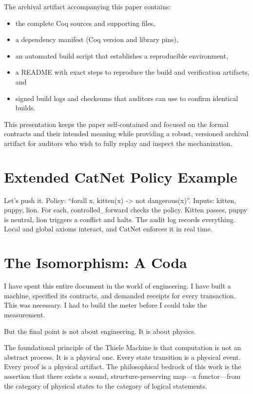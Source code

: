 \documentclass[11pt]{article}
\begin{document}
The archival artifact accompanying this paper contains:
\begin{itemize}
  \item the complete Coq sources and supporting files,
  \item a dependency manifest (Coq version and library pins),
  \item an automated build script that establishes a reproducible environment,
  \item a README with exact steps to reproduce the build and verification artifacts, and
  \item signed build logs and checksums that auditors can use to confirm identical builds.
\end{itemize}

This presentation keeps the paper self-contained and focused on the formal contracts and their intended meaning while providing a robust, versioned archival artifact for auditors who wish to fully replay and inspect the mechanization.

\section{Extended CatNet Policy Example}
Let's push it. Policy: ``forall x, kitten(x) -> not dangerous(x)''. Inputs: kitten, puppy, lion. For each, controlled_forward checks the policy. Kitten passes, puppy is neutral, lion triggers a conflict and halts. The audit log records everything. Local and global axioms interact, and CatNet enforces it in real time.

\section{The Isomorphism: A Coda}
I have spent this entire document in the world of engineering. I have built a machine, specified its contracts, and demanded receipts for every transaction. This was necessary. I had to build the meter before I could take the measurement.

But the final point is not about engineering. It is about physics.

The foundational principle of the Thiele Machine is that computation is not an abstract process. It is a physical one. Every state transition is a physical event. Every proof is a physical artifact. The philosophical bedrock of this work is the assertion that there exists a sound, structure-preserving map—a functor—from the category of physical states to the category of logical statements.
\end{document}
